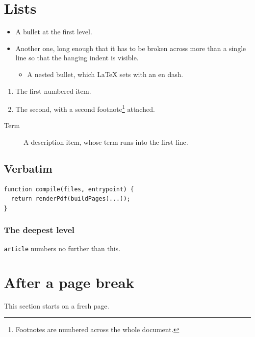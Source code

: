 \section{Lists}
\label{sec:lists}

\begin{itemize}
  \item A bullet at the first level.
  \item Another one, long enough that it has to be broken across more than a
        single line so that the hanging indent is visible.
  \begin{itemize}
    \item A nested bullet, which LaTeX sets with an en dash.
  \end{itemize}
\end{itemize}

\begin{enumerate}
  \item The first numbered item.
  \item The second, with a second footnote\footnote{Footnotes are numbered
        across the whole document.} attached.
\end{enumerate}

\begin{description}
  \item[Term] A description item, whose term runs into the first line.
\end{description}

\subsection{Verbatim}

\begin{verbatim}
function compile(files, entrypoint) {
  return renderPdf(buildPages(...));
}
\end{verbatim}

\subsubsection{The deepest level}

\texttt{article} numbers no further than this.

\newpage

\section{After a page break}

This section starts on a fresh page.
